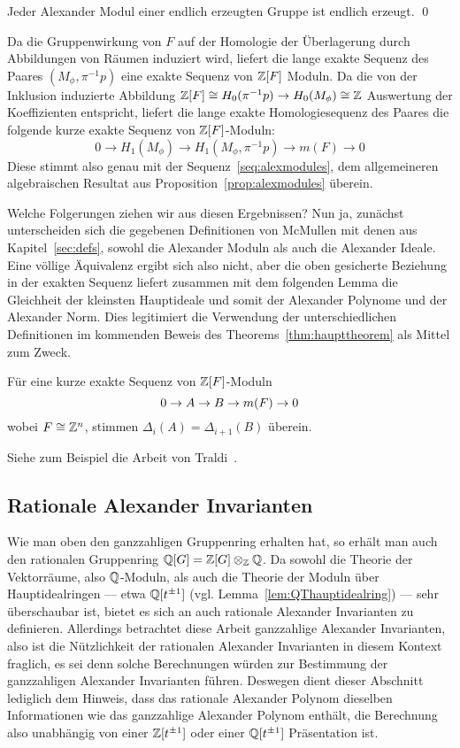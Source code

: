 \begin{cor}
		Jeder Alexander Modul einer endlich erzeugten Gruppe ist endlich erzeugt. \qed
\end{cor}

Da die Gruppenwirkung von $F$ auf der Homologie der Überlagerung durch Abbildungen von Räumen induziert wird, liefert die lange exakte Sequenz des Paares $(M_\phi,\pi^{-1} p)$ eine exakte Sequenz von $\mathbb{Z}[F]$ Moduln. Da die von der Inklusion induzierte Abbildung $\mathbb{Z}[F]\cong H_0(\pi^{-1} p) \to H_0 (M_\phi) \cong \mathbb{Z}$ Auswertung der Koeffizienten entspricht, liefert die lange exakte Homologiesequenz des Paares die folgende kurze exakte Sequenz von $\mathbb{Z}[F]$-Moduln:
\[
	0 \to H_1(M_\phi) \to H_1(M_\phi,\pi^{-1} p ) \to m(F) \to 0
\]
Diese stimmt also genau mit der Sequenz~\eqref{seq:alexmodules}, dem allgemeineren algebraischen Resultat aus Proposition~\ref{prop:alexmodules} überein.

Welche Folgerungen ziehen wir aus diesen Ergebnissen? Nun ja, zunächst unterscheiden sich die gegebenen Definitionen von McMullen mit denen aus Kapitel~\ref{sec:defs}, sowohl die Alexander Moduln als auch die Alexander Ideale. Eine völlige Äquivalenz ergibt sich also nicht, aber die oben gesicherte Beziehung in der exakten Sequenz liefert zusammen mit dem folgenden Lemma die Gleichheit der kleinsten Hauptideale und somit der Alexander Polynome und der Alexander Norm. Dies legitimiert die Verwendung der unterschiedlichen Definitionen im kommenden Beweis des Theorems~\ref{thm:haupttheorem} als Mittel zum Zweck.

\begin{lem}
 	Für eine kurze exakte Sequenz von $\mathbb{Z}[F]$-Moduln
 	\[
 	 	0\to A\to B\to m(F)\to0
 	 \] wobei $F\cong \mathbb{Z}^n$, stimmen $\Delta_i(A)=\Delta_{i+1}(B)$ überein. 
 \end{lem} 
 Siehe zum Beispiel die Arbeit von Traldi~\cite{Traldi.1982}.

	 \subsection{Rationale Alexander Invarianten}
	 \label{ssec:rationalalex}
	 Wie man oben den ganzzahligen Gruppenring erhalten hat, so erhält man auch den rationalen Gruppenring $\mathbb{Q}[G]=\mathbb{Z}[G] \otimes_{\mathbb{Z}} \mathbb{Q}$. Da sowohl die Theorie der Vektorräume, also $\mathbb{Q}$-Moduln, als auch die Theorie der Moduln über Hauptidealringen --- etwa $\mathbb{Q}[t^{\pm 1}]$ (vgl. Lemma~\ref{lem:QThauptidealring}) ---  sehr überschaubar ist, bietet es sich an auch rationale Alexander Invarianten zu definieren. Allerdings betrachtet diese Arbeit ganzzahlige Alexander Invarianten, also ist die Nützlichkeit der rationalen Alexander Invarianten in diesem Kontext fraglich, es sei denn solche Berechnungen würden zur Bestimmung der ganzzahligen Alexander Invarianten führen. Deswegen dient dieser Abschnitt lediglich dem Hinweis, dass das rationale Alexander Polynom dieselben Informationen wie das ganzzahlige Alexander Polynom enthält, die Berechnung also unabhängig von einer $\mathbb{Z}[t^{\pm 1}]$ oder einer $\mathbb{Q}[t^{\pm 1}]$ Präsentation ist.


